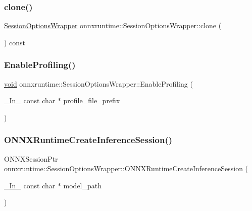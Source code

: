 \subsubsection{\texorpdfstring{clone()}{clone()}}
{\footnotesize\ttfamily \mbox{\hyperlink{classonnxruntime_1_1SessionOptionsWrapper}{Session\+Options\+Wrapper}} onnxruntime\+::\+Session\+Options\+Wrapper\+::clone (\begin{DoxyParamCaption}{ }\end{DoxyParamCaption}) const\hspace{0.3cm}{\ttfamily [inline]}}

\mbox{\label{classonnxruntime_1_1SessionOptionsWrapper_aaca0434dec567332dd1903ca2b79d91b}} 
\subsubsection{\texorpdfstring{Enable\+Profiling()}{EnableProfiling()}}
{\footnotesize\ttfamily \mbox{\hyperlink{mlasi_8h_a88f941d423cb2a819b70a1358982b1a6}{void}} onnxruntime\+::\+Session\+Options\+Wrapper\+::\+Enable\+Profiling (\begin{DoxyParamCaption}\item[{\mbox{\hyperlink{visibility__macros_8h_aa74f89aa7d942f4a79ea12d7c9b763ef}{\+\_\+\+In\+\_\+}} const char $\ast$}]{profile\+\_\+file\+\_\+prefix }\end{DoxyParamCaption})\hspace{0.3cm}{\ttfamily [inline]}}

\mbox{\label{classonnxruntime_1_1SessionOptionsWrapper_a1c3a0aa13d30416af7278f6e23a646d6}} 
\subsubsection{\texorpdfstring{O\+N\+N\+X\+Runtime\+Create\+Inference\+Session()}{ONNXRuntimeCreateInferenceSession()}}
{\footnotesize\ttfamily O\+N\+N\+X\+Session\+Ptr onnxruntime\+::\+Session\+Options\+Wrapper\+::\+O\+N\+N\+X\+Runtime\+Create\+Inference\+Session (\begin{DoxyParamCaption}\item[{\mbox{\hyperlink{visibility__macros_8h_aa74f89aa7d942f4a79ea12d7c9b763ef}{\+\_\+\+In\+\_\+}} const char $\ast$}]{model\+\_\+path }\end{DoxyParamCaption})\hspace{0.3cm}{\ttfamily [inline]}}


